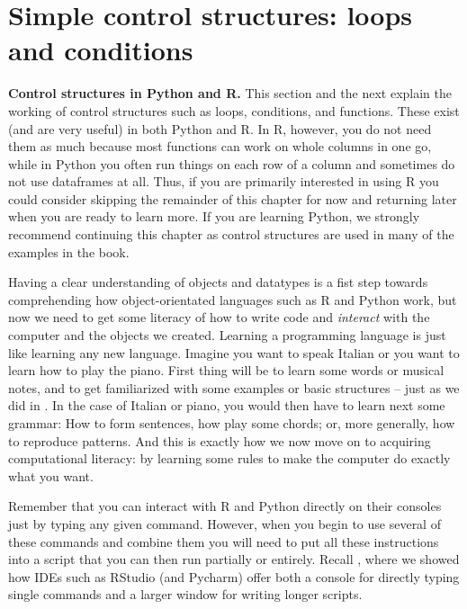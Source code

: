 \section{Simple control structures: loops and conditions}	
\label{sec:controlstructures}

\begin{feature}\textbf{Control structures in Python and R.}
  This section and the next explain the working of control structures
  such as loops, conditions, and functions.
  These exist (and are very useful) in both Python and R.
  In R, however, you do not need them as much because most functions
  can work on whole columns in one go, while in Python you often run things
  on each row of a column and sometimes do not use dataframes at all.
  Thus, if you are primarily interested in using R you could consider skipping
  the remainder of this chapter for now and returning later when you are ready to learn more.
  If you are learning Python, we strongly recommend continuing this chapter as
  control structures are used in many of the examples in the book.
  \end{feature}
  


Having a clear understanding of objects and datatypes is a fist step
towards comprehending how object-orientated languages such as R and Python work,
but now we need to get some literacy of how to write code and \emph{interact}
with the computer and the objects we created. Learning a programming
language is just like learning any new language.  Imagine you want to
speak Italian or you want to learn how to play the piano. First thing
will be to learn some words or musical notes, and to get familiarized
with some examples or basic structures -- just as we did in . In the
case of Italian or piano, you would then have to learn next some grammar:
How to form sentences, how play some chords; or, more generally,
how to reproduce patterns. And this is exactly how we 
now move on to acquiring computational literacy: by learning some
rules to make the computer do exactly what you want.

Remember that you can interact with R and Python directly on their
consoles just by typing any given command. However, when
you begin to use several of these commands and combine them
you will need to put all these instructions into a
script that you can then run partially or entirely. Recall ,
where we showed how IDEs such as RStudio (and Pycharm) offer both a
console for directly typing single commands and a larger window
for writing longer scripts.

